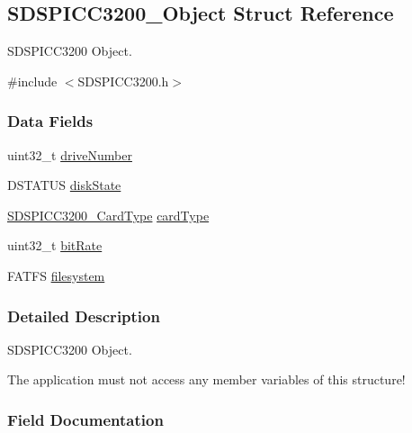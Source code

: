 \subsection{S\+D\+S\+P\+I\+C\+C3200\+\_\+\+Object Struct Reference}
\label{struct_s_d_s_p_i_c_c3200___object}


S\+D\+S\+P\+I\+C\+C3200 Object.  




{\ttfamily \#include $<$S\+D\+S\+P\+I\+C\+C3200.\+h$>$}

\subsubsection*{Data Fields}
\begin{DoxyCompactItemize}
\item 
uint32\+\_\+t \hyperlink{struct_s_d_s_p_i_c_c3200___object_a79ac1ce3451b5ef57859a289ae9fec22}{drive\+Number}
\item 
D\+S\+T\+A\+T\+U\+S \hyperlink{struct_s_d_s_p_i_c_c3200___object_ab2616f0419bf15e11e2e066d2af1de49}{disk\+State}
\item 
\hyperlink{_s_d_s_p_i_c_c3200_8h_aef9c37db8744ba414b93ef56c1473be7}{S\+D\+S\+P\+I\+C\+C3200\+\_\+\+Card\+Type} \hyperlink{struct_s_d_s_p_i_c_c3200___object_a4b78b0482f55e904320e627d88979261}{card\+Type}
\item 
uint32\+\_\+t \hyperlink{struct_s_d_s_p_i_c_c3200___object_a835314275c71a9e04b55e79c01963603}{bit\+Rate}
\item 
F\+A\+T\+F\+S \hyperlink{struct_s_d_s_p_i_c_c3200___object_abe597d34136c1852c3c39971255b2204}{filesystem}
\end{DoxyCompactItemize}


\subsubsection{Detailed Description}
S\+D\+S\+P\+I\+C\+C3200 Object. 

The application must not access any member variables of this structure! 

\subsubsection{Field Documentation}
